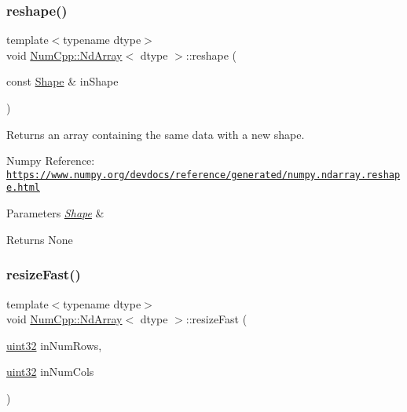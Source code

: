 \subsubsection{\texorpdfstring{reshape()}{reshape()}\hspace{0.1cm}{\footnotesize\ttfamily [2/2]}}
{\footnotesize\ttfamily template$<$typename dtype$>$ \\
void \mbox{\hyperlink{class_num_cpp_1_1_nd_array}{Num\+Cpp\+::\+Nd\+Array}}$<$ dtype $>$\+::reshape (\begin{DoxyParamCaption}\item[{const \mbox{\hyperlink{class_num_cpp_1_1_shape}{Shape}} \&}]{in\+Shape }\end{DoxyParamCaption})\hspace{0.3cm}{\ttfamily [inline]}}

Returns an array containing the same data with a new shape.

Numpy Reference\+: \href{https://www.numpy.org/devdocs/reference/generated/numpy.ndarray.reshape.html}{\tt https\+://www.\+numpy.\+org/devdocs/reference/generated/numpy.\+ndarray.\+reshape.\+html}


\begin{DoxyParams}{Parameters}
{\em \mbox{\hyperlink{class_num_cpp_1_1_shape}{Shape}}} & \\
\hline
\end{DoxyParams}
\begin{DoxyReturn}{Returns}
None 
\end{DoxyReturn}
\mbox{\label{class_num_cpp_1_1_nd_array_a975989356bda11d4e679317b9903cb85}} 
\subsubsection{\texorpdfstring{resize\+Fast()}{resizeFast()}\hspace{0.1cm}{\footnotesize\ttfamily [1/2]}}
{\footnotesize\ttfamily template$<$typename dtype$>$ \\
void \mbox{\hyperlink{class_num_cpp_1_1_nd_array}{Num\+Cpp\+::\+Nd\+Array}}$<$ dtype $>$\+::resize\+Fast (\begin{DoxyParamCaption}\item[{\mbox{\hyperlink{namespace_num_cpp_a36f388e948380413c63011cab9b7fbd5}{uint32}}}]{in\+Num\+Rows,  }\item[{\mbox{\hyperlink{namespace_num_cpp_a36f388e948380413c63011cab9b7fbd5}{uint32}}}]{in\+Num\+Cols }\end{DoxyParamCaption})\hspace{0.3cm}{\ttfamily [inline]}}

